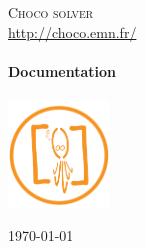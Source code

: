 \begin{titlepage}
\begin{center}
\textsc{\LARGE Choco solver}\\
\url{http://choco.emn.fr/}\\[1.5cm]

\HRule \\[0.4cm]
{ \Huge \bfseries Documentation}\\
\HRule \\[1cm]
\includegraphics[width=0.20\textwidth]{../shared/media/logo.pdf} 

\vfill
{\large \today}
\end{center}
\end{titlepage}

\clearpage

